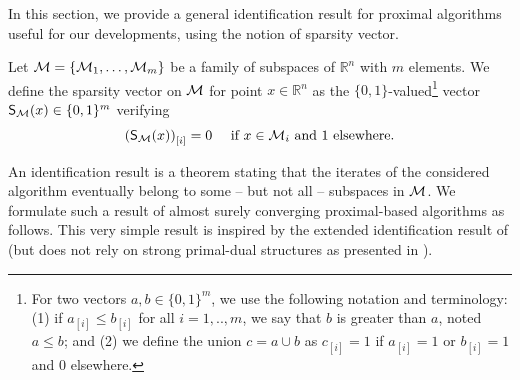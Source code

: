 In this section, we provide a general identification result for proximal algorithms useful for our developments, using the notion of sparsity vector.

\begin{definition}\label{def:sparsity}
Let $\M= \{ \M_1,\ldots,\M_m\}$ be a family of subspaces of $\mathbb{R}^n$ with $m$ elements. We define the {sparsity vector} on $\M$ for point $x\in\mathbb{R}^n$ as the $\{0,1\}$-valued\footnote{For two vectors $a,b\in\{0,1\}^m$, we use the following notation and terminology: (1) if  $a_{[i]} \leq b_{[i]}$ for all $i=1,..,m$, we say that $b$ is greater than $a$, noted $a\leq b$; and (2) we define the union $c = a\cup b$ as $c_{[i]} = 1 $ if $a_{[i]} = 1$ or $b_{[i]}=1$ and $0$ elsewhere.} vector  $\S(x)\in \{0,1\}^m$ verifying
\begin{align}\label{eq:strata}
    \left( \S(x) \right)_{[i]} = 0 \quad\text{ if } x \in \M_i \text{ and } 1 \text{ elsewhere}.
\end{align}
\end{definition}

An identification result is a theorem stating that the iterates of the considered algorithm eventually belong to some -- but not all -- subspaces in $\M$. We formulate such a result of almost surely converging proximal-based algorithms as follows. This very simple result is inspired by the extended identification result of \cite{fadili2018sensitivity} (but does not rely on strong primal-dual structures as presented in \cite{fadili2018sensitivity}).

